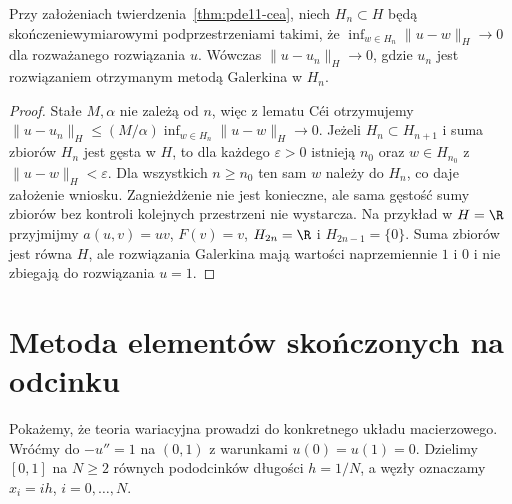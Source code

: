 \begin{wniosek}
\label{cor:pde11-galerkin-density}
Przy założeniach twierdzenia~\ref{thm:pde11-cea},
niech $H_n\subset H$ będą skończeniewymiarowymi
podprzestrzeniami takimi, że
$\inf_{w\in H_n}\|u-w\|_H\to0$ dla rozważanego rozwiązania $u$.
Wówczas $\|u-u_n\|_H\to0$, gdzie $u_n$ jest rozwiązaniem otrzymanym metodą Galerkina
w $H_n$.
\end{wniosek}
\begin{proof}
Stałe $M,\alpha$ nie zależą od $n$, więc z lematu Céi
otrzymujemy $\|u-u_n\|_H\le (M/\alpha)
\inf_{w\in H_n}\|u-w\|_H\to0$.
Jeżeli $H_n\subset H_{n+1}$ i suma zbiorów $H_n$
jest gęsta w $H$, to dla każdego $\varepsilon>0$
istnieją $n_0$ oraz $w\in H_{n_0}$ z
$\|u-w\|_H<\varepsilon$. Dla wszystkich $n\ge n_0$
ten sam $w$ należy do $H_n$, co daje założenie wniosku.
Zagnieżdżenie nie jest konieczne, ale sama gęstość
sumy zbiorów bez kontroli kolejnych przestrzeni nie
wystarcza. Na przykład w $H=\R$ przyjmijmy
$a(u,v)=uv$, $F(v)=v$, $H_{2n}=\R$ i $H_{2n-1}=\{0\}$.
Suma zbiorów jest równa $H$, ale rozwiązania Galerkina
mają wartości naprzemiennie $1$ i $0$ i nie zbiegają
do rozwiązania $u=1$.
\end{proof}

\section{Metoda elementów skończonych na odcinku}
\label{sec:pde11-fem}

Pokażemy, że teoria wariacyjna prowadzi do konkretnego układu
macierzowego. Wróćmy do $-u''=1$ na $(0,1)$ z
warunkami $u(0)=u(1)=0$. Dzielimy $[0,1]$ na
$N\ge2$ równych pododcinków długości $h=1/N$,
a węzły oznaczamy $x_i=ih$, $i=0,\ldots,N$.

